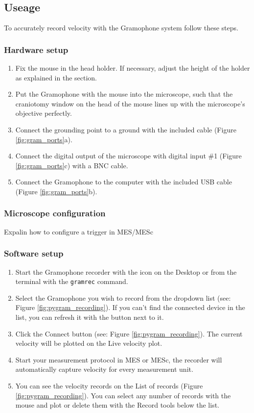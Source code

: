 \documentclass[11pt,a4paper]{article}
\newcommand{\enote}[1]{\textcolor{RubineRed}{#1}}
\begin{document}
\subsection{Useage}
To accurately record velocity with the Gramophone system follow these steps.

\subsubsection{Hardware setup}
\begin{enumerate}
\item Fix the mouse in the head holder. If necessary, adjust the height of the holder as explained in the   section.
\item Put the Gramophone with the mouse into the microscope, such that the craniotomy window on the head of the mouse lines up with the microscope's objective perfectly.
\item Connect the grounding point to a ground with the included cable (Figure \ref{fig:gram_ports}a).
\item Connect the digital output of the microscope with digital input \#1 (Figure \ref{fig:gram_ports}c) with a BNC cable.
\item Connect the Gramophone to the computer with the included USB cable (Figure \ref{fig:gram_ports}b).
\end{enumerate}

\subsubsection{Microscope configuration}
\enote{Expalin how to configure a trigger in MES/MESc}

\subsubsection{Software setup}
\begin{enumerate}
\item Start the Gramophone recorder with the icon on the Desktop or from the terminal with the \texttt{gramrec} command.
\item Select the Gramophone you wish to record from the dropdown list (see: Figure \ref{fig:pygram_recording}). If you can't find the connected device in the list, you can refresh it with the button next to it.
\item Click the Connect button (see: Figure \ref{fig:pygram_recording}). The current velocity will be plotted on the Live velocity plot.
\item Start your measurement protocol in MES or MESc, the recorder will automatically capture velocity for every measurement unit.
\item You can see the velocity records on the List of records (Figure \ref{fig:pygram_recording}). You can select any number of records with the mouse and plot or delete them with the Record tools below the list.

\end{enumerate}
\end{document}
